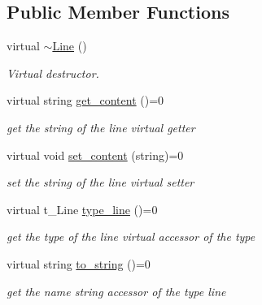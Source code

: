 \subsection*{Public Member Functions}
\begin{DoxyCompactItemize}
\item 
\mbox{\label{class_line_a4a95bafcefa28672b3999deb011b9e50}} 
virtual \mbox{\hyperlink{class_line_a4a95bafcefa28672b3999deb011b9e50}{$\sim$\+Line}} ()
\begin{DoxyCompactList}\small\item\em Virtual destructor. \end{DoxyCompactList}\item 
\mbox{\label{class_line_aa7f74673c9c3a7423a513a5fb64bf825}} 
virtual string \mbox{\hyperlink{class_line_aa7f74673c9c3a7423a513a5fb64bf825}{get\+\_\+content}} ()=0
\begin{DoxyCompactList}\small\item\em get the string of the line virtual getter \end{DoxyCompactList}\item 
\mbox{\label{class_line_afa27867ffd08e6915d9e791d2ed0b448}} 
virtual void \mbox{\hyperlink{class_line_afa27867ffd08e6915d9e791d2ed0b448}{set\+\_\+content}} (string)=0
\begin{DoxyCompactList}\small\item\em set the string of the line virtual setter \end{DoxyCompactList}\item 
\mbox{\label{class_line_a0cc2cdd9bc04649adebd1ff9b753bc85}} 
virtual t\+\_\+\+Line \mbox{\hyperlink{class_line_a0cc2cdd9bc04649adebd1ff9b753bc85}{type\+\_\+line}} ()=0
\begin{DoxyCompactList}\small\item\em get the type of the line virtual accessor of the type \end{DoxyCompactList}\item 
virtual string \mbox{\hyperlink{class_line_a477523118f17d72f58f2912b391afc73}{to\+\_\+string}} ()=0
\begin{DoxyCompactList}\small\item\em get the name string accessor of the type line \end{DoxyCompactList}\item 

\end{DoxyCompactItemize}
